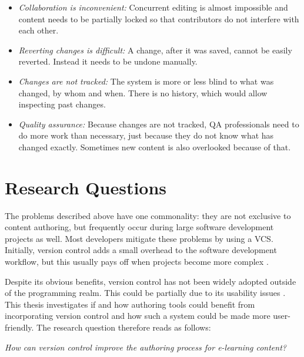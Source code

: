 \begin{itemize}
  \item \textit{Collaboration is inconvenient:} Concurrent editing is almost impossible and content needs to be partially locked so that contributors do not interfere with each other.
  \item \textit{Reverting changes is difficult:} A change, after it was saved, cannot be easily reverted. Instead it needs to be undone manually.
  \item \textit{Changes are not tracked:} The system is more or less blind to what was changed, by whom and when. There is no history, which would allow inspecting past changes.
  \item \textit{Quality assurance:} Because changes are not tracked, \ac{QA} professionals need to do more work than necessary, just because they do not know what has changed exactly. Sometimes new content is also overlooked because of that.
\end{itemize}


\section{Research Questions} %
The problems described above have one commonality: they are not exclusive to content authoring, but frequently occur during large software development projects as well. Most developers mitigate these problems by using a \ac{VCS}. Initially, version control adds a small overhead to the software development workflow, but this usually pays off when projects become more complex \cite{spinellis_version_2005}.

Despite its obvious benefits, version control has not been widely adopted outside of the programming realm. This could be partially due to its usability issues \cite{church_case_2014,perez_de_rosso_whats_2013}.
This thesis investigates if and how authoring tools could benefit from incorporating version control and how such a system could be made more user-friendly. The research question therefore reads as follows:

\begin{center}
 \textit{How can version control improve the authoring process for e-learning content?}
\end{center}

